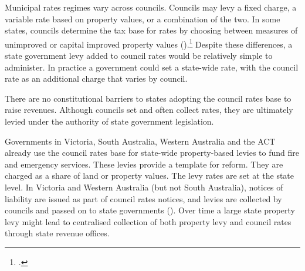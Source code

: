 \documentclass[twoside,english]{palatinob5ona4portrait}
\begin{document}
Municipal rates regimes vary across councils. Councils may levy a fixed charge, a variable rate based on property values, or a combination of the two. In some states, councils determine the tax base for rates by choosing between measures of unimproved or capital improved property values ().\footcite[][198]{productivity2008assessing}  Despite these differences, a state government levy added to council rates would be relatively simple to administer. In practice a government could set a state-wide rate, with the council rate as an additional charge that varies by council.

There are no constitutional barriers to states adopting the council rates base to raise revenues. Although councils set and often collect rates, they are ultimately levied under the authority of state government legislation. 


Governments in Victoria, South Australia, Western Australia and the ACT already use the council rates base for state-wide property-based levies to fund fire and emergency services. These levies provide a template for reform. They are charged as a share of land or property values. The levy rates are set at the state level. In Victoria and Western Australia (but not South Australia), notices of liability are issued as part of council rates notices, and levies are collected by councils and passed on to state governments (). Over time a large state property levy might lead to centralised collection of both property levy and council rates through state revenue offices.
\end{document}
